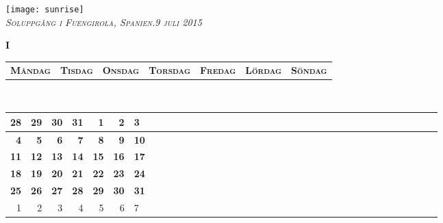 \documentclass[landscape,a4paper]{article}
\newcommand{\nl}{\\[2.1cm]\hline}
\newcommand{\nd}[1]{\textcolor[rgb]{0.6,0.6,0.6}{#1}}
\newcommand{\ns}[1]{\textcolor[rgb]{1,0.6,0.6}{#1}}
\newcommand{\rd}[1]{\textcolor[rgb]{1,0,0}{\textbf{#1}}}
\newcommand{\tb}[1]{\textbf{#1}}
\begin{document}
\pagestyle{empty}
\begin{center}
  \noindent\texttt{[image: sunrise]}\\
  \textit{\textsc{Soluppgång i Fuengirola, Spanien.}}\hfill\textit{\textsc{9 juli 2015}}
\end{center}
\newpage
\begin{center}
  \Huge{\textbf{I}}
\end{center}
\begin{tabularx}{\textwidth}{@{}RRRRRRS}
  \textbf{\textsc{Måndag}}&\textbf{\textsc{Tisdag}}&\textbf{\textsc{Onsdag}}&\textbf{\textsc{Torsdag}}&\textbf{\textsc{Fredag}}&\textbf{\textsc{Lördag}}&\textbf{\textsc{Söndag}}\\
\end{tabularx}
\\
\begin{tabularx}{\textwidth}{|D|D|D|D|D|D|Z|}
  \hline
  \nd{28}&\nd{29}&\nd{30}&\ns{31}&\rd{1}&\tb{2}&\tb{3}\nl
  \tb{4}&\tb{5}&\rd{6}&\tb{7}&\tb{8}&\tb{9}&\tb{10}\nl
  \tb{11}&\tb{12}&\tb{13}&\tb{14}&\tb{15}&\tb{16}&\tb{17}\nl
  \tb{18}&\tb{19}&\tb{20}&\tb{21}&\tb{22}&\tb{23}&\tb{24}\nl
  \tb{25}&\tb{26}&\tb{27}&\tb{28}&\tb{29}&\tb{30}&\tb{31}\nl
  \nd{1}&\nd{2}&\nd{3}&\nd{4}&\nd{5}&\nd{6}&\ns{7}\nl
\end{tabularx}
\end{document}
